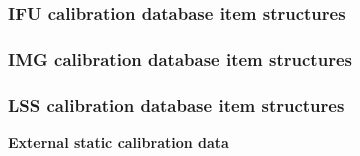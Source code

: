 \subsubsection{IFU calibration database item structures}\label{sssec:lmscaldbdatastructs}


\subsubsection{IMG calibration database item structures}\label{sssec:imgcaldbdatastructs}

\subsubsection{LSS calibration database item structures}\label{sssec:lsscaldbdatastructs}
\textbf{External static calibration data}
